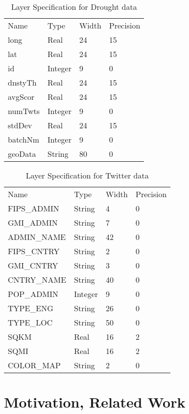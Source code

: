 \documentclass[conference]{IEEEtran}
\begin{document}
\begin{table}[]
\caption{Layer Specification for Drought data}
\label{Table 1}
\centering
\begin{tabular}{llll}
Name    & Type    & Width & Precision \\
long    & Real    & 24    & 15        \\
lat     & Real    & 24    & 15        \\
id      & Integer & 9     & 0         \\
dnstyTh & Real    & 24    & 15        \\
avgScor & Real    & 24    & 15        \\
numTwts & Integer & 9     & 0         \\
stdDev  & Real    & 24    & 15        \\
batchNm & Integer & 9     & 0         \\
geoData & String  & 80    & 0        
\end{tabular}
\end{table}

\begin{table}[]
\caption{Layer Specification for Twitter data}
\label{Table 2}
\centering
\begin{tabular}{llll}
Name        & Type    & Width & Precision \\
FIPS\_ADMIN & String  & 4     & 0         \\
GMI\_ADMIN  & String  & 7     & 0         \\
ADMIN\_NAME & String  & 42    & 0         \\
FIPS\_CNTRY & String  & 2     & 0         \\
GMI\_CNTRY  & String  & 3     & 0         \\
CNTRY\_NAME & String  & 40    & 0         \\
POP\_ADMIN  & Integer & 9     & 0         \\
TYPE\_ENG   & String  & 26    & 0         \\
TYPE\_LOC   & String  & 50    & 0         \\
SQKM        & Real    & 16    & 2         \\
SQMI        & Real    & 16    & 2         \\
COLOR\_MAP  & String  & 2     & 0        
\end{tabular}
\end{table}

\section{Motivation, Related Work}
\end{document}
